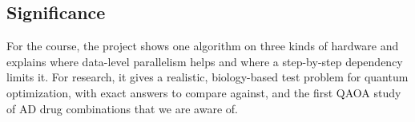 \subsection{Significance}

For the course, the project shows one algorithm on three kinds of hardware and explains where data-level parallelism helps and where a step-by-step dependency limits it. For research, it gives a realistic, biology-based test problem for quantum optimization, with exact answers to compare against, and the first QAOA study of AD drug combinations that we are aware of.
